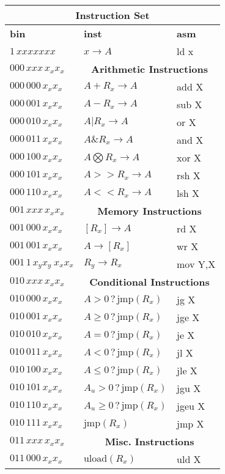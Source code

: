 \documentclass[11pt]{article}
\begin{document}
\begin{tabular}{|l | l | l |}
\hline
\multicolumn{3}{|c|}{ \textbf{Instruction Set}} \\
\hline
\textbf{bin} & \textbf{inst} & \textbf{asm}\\
\hline 
$1\,xxxxxxx$ & $x \rightarrow A$ & ld x  \\
\hline
$000\,xxx\,x_x x_x$&\multicolumn{2}{c|}{ \textbf{Arithmetic Instructions}} \\
\hline
$000\,000\,x_x x_x$ & $A + R_x \rightarrow A$ & add X \\
$000\,001\,x_x x_x$ & $A - R_x \rightarrow A$ & sub X \\
$000\,010\,x_x x_x$ & $A | R_x \rightarrow A$ & or X \\
$000\,011\, x_x x_x$ & $A \& R_x \rightarrow A$ & and X \\
$000\,100\, x_x x_x$ & $A \bigotimes R_x \rightarrow A$ & xor X \\
$000\,101\, x_x x_x$ & $A >> R_x \rightarrow A$ & rsh X \\
$000\,110\, x_x x_x$ & $A << R_x \rightarrow A$ & lsh X \\
\hline
$001\,xxx\,x_x x_x$&\multicolumn{2}{c|}{ \textbf{Memory Instructions}} \\
\hline
$001\,000\, x_x x_x$ & $[R_x] \rightarrow A$ & rd X \\
$001\,001\, x_x x_x$ & $A \rightarrow [R_x]$ & wr X \\
$001\,1\, x_y x_y\ x_x x_x$ & $R_y \rightarrow R_x$ & mov Y,X \\
\hline
$010\,xxx\,x_x x_x$&\multicolumn{2}{c|}{ \textbf{Conditional Instructions}} \\
\hline
$010\,000\, x_x x_x$ & $A > 0 \,?\, \mathrm{jmp}(R_x)$ & jg X \\
$010\,001\, x_x x_x$ & $A \geq 0 \,?\, \mathrm{jmp}(R_x)$ & jge X \\
$010\,010\, x_x x_x$ & $A = 0 \,?\, \mathrm{jmp}(R_x)$ & je X \\
$010\,011\, x_x x_x$ & $A < 0 \,?\, \mathrm{jmp}(R_x)$ & jl X \\
$010\,100\, x_x x_x$ & $A \leq 0 \,?\, \mathrm{jmp}(R_x)$ & jle X \\
$010\,101\, x_x x_x$ & $A_u > 0 \,?\, \mathrm{jmp}(R_x)$ & jgu X \\
$010\,110\, x_x x_x$ & $A_u \geq 0 \,?\, \mathrm{jmp}(R_x)$ & jgeu X \\
$010\,111\, x_x x_x$ & $\mathrm{jmp}(R_x)$ & jmp X \\
\hline
$011\,xxx\,x_x x_x$&\multicolumn{2}{c|}{ \textbf{Misc. Instructions}} \\
\hline
$011\,000\, x_x x_x$ & $\mathrm{uload}(R_x)$ & uld X \\
\hline
\end{tabular}
\end{document}
